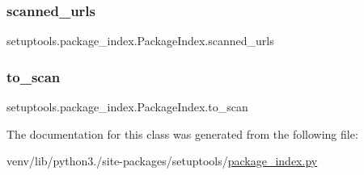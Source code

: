 \subsubsection{\texorpdfstring{scanned\+\_\+urls}{scanned\_urls}}
{\footnotesize\ttfamily setuptools.\+package\+\_\+index.\+Package\+Index.\+scanned\+\_\+urls}

\mbox{\label{classsetuptools_1_1package__index_1_1PackageIndex_a8e17032ca68311191142a563ec67c3e6}} 
\subsubsection{\texorpdfstring{to\+\_\+scan}{to\_scan}}
{\footnotesize\ttfamily setuptools.\+package\+\_\+index.\+Package\+Index.\+to\+\_\+scan}



The documentation for this class was generated from the following file\+:\begin{DoxyCompactItemize}
\item 
venv/lib/python3./site-\/packages/setuptools/\hyperlink{package__index_8py}{package\+\_\+index.\+py}\end{DoxyCompactItemize}
